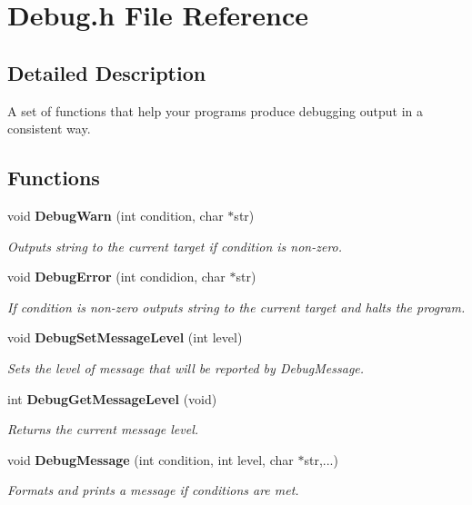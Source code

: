 \section{Debug.h File Reference}
\label{Debug_8h}


\subsection{Detailed Description}
A set of functions that help your programs produce debugging output in a consistent way. 



\subsection*{Functions}
\begin{CompactItemize}
\item 
void {\bf Debug\-Warn} (int condition, char $\ast$str)
\begin{CompactList}\small\item\em Outputs string to the current target if condition is non-zero. \item\end{CompactList}\item 
void {\bf Debug\-Error} (int condidion, char $\ast$str)
\begin{CompactList}\small\item\em If condition is non-zero outputs string to the current target and halts the program. \item\end{CompactList}\item 
void {\bf Debug\-Set\-Message\-Level} (int level)
\begin{CompactList}\small\item\em Sets the level of message that will be reported by Debug\-Message. \item\end{CompactList}\item 
int {\bf Debug\-Get\-Message\-Level} (void)
\begin{CompactList}\small\item\em Returns the current message level. \item\end{CompactList}\item 
void {\bf Debug\-Message} (int condition, int level, char $\ast$str,...)
\begin{CompactList}\small\item\em Formats and prints a message if conditions are met. \item\end{CompactList}\item 

\end{CompactItemize}
